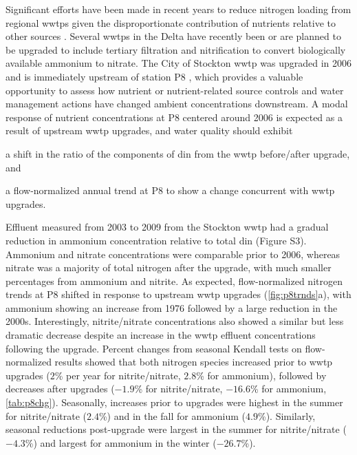 \documentclass[letterpaper,12pt,oneside]{article}\usepackage[]{graphicx}\usepackage[]{color}
\begin{document}
Significant efforts have been made in recent years to reduce nitrogen loading from regional \acp{wwtp} given the disproportionate contribution of nutrients relative to other sources \cite{Cornwell14,Novick15}.  Several \acp{wwtp} in the Delta have recently been or are planned to be upgraded to include tertiary filtration and nitrification to convert biologically available ammonium to nitrate. The City of Stockton \ac{wwtp} was upgraded in 2006 and is immediately upstream of station P8 \cite{Jabusch16}, which provides a valuable opportunity to assess how nutrient or nutrient-related source controls and water management actions have changed ambient concentrations downstream. A modal response of nutrient concentrations at P8 centered around 2006 is expected as a result of upstream \ac{wwtp} upgrades, and water quality should exhibit \begin{inparaenum}[1\upshape)]
\item a shift in the ratio of the components of \ac{din} from the \ac{wwtp} before/after upgrade, and
\item a flow-normalized annual trend at P8 to show a change concurrent with \ac{wwtp} upgrades.
\end{inparaenum}



Effluent measured from 2003 to 2009 from the Stockton \ac{wwtp} had a gradual reduction in ammonium concentration relative to total \ac{din} (Figure S3).  Ammonium and nitrate concentrations were comparable prior to 2006, whereas nitrate was a majority of total nitrogen after the upgrade, with much smaller percentages from ammonium and nitrite. As expected, flow-normalized nitrogen trends at P8 shifted in response to upstream \ac{wwtp} upgrades (\cref{fig:p8trnds}a), with ammonium showing an increase from 1976 followed by a large reduction in the 2000s.  Interestingly, nitrite/nitrate concentrations also showed a similar but less dramatic decrease despite an increase in the \ac{wwtp} effluent concentrations following the upgrade.  Percent changes from seasonal Kendall tests on flow-normalized results showed that both nitrogen species increased prior to \ac{wwtp} upgrades ($2$\% per year for nitrite/nitrate, $2.8$\% for ammonium), followed by decreases after upgrades ($-1.9$\% for nitrite/nitrate, $-16.6$\% for ammonium, \cref{tab:p8chg}).  Seasonally, increases prior to upgrades were highest in the summer for nitrite/nitrate ($2.4$\%) and in the fall for ammonium ($4.9$\%). Similarly, seasonal reductions post-upgrade were largest in the summer for nitrite/nitrate ($-4.3$\%) and largest for ammonium in the winter ($-26.7$\%).
\end{document}
